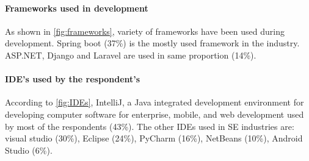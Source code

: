 
\paragraph{Frameworks used in development}
As shown in \ref{fig:frameworks}, variety of frameworks have been used during development. Spring boot (37\%) is the mostly used framework in the industry. ASP.NET, Django and Laravel are used in same proportion (14\%).

\paragraph{IDE's used by the respondent's}
According to \ref{fig:IDEs}, IntelliJ, a Java integrated development environment for developing computer software for enterprise, mobile, and web development used by most of the respondents (43\%). The other IDEs used in SE industries are: visual studio (30\%), Eclipse (24\%), PyCharm (16\%), NetBeans (10\%), Android Studio (6\%).
